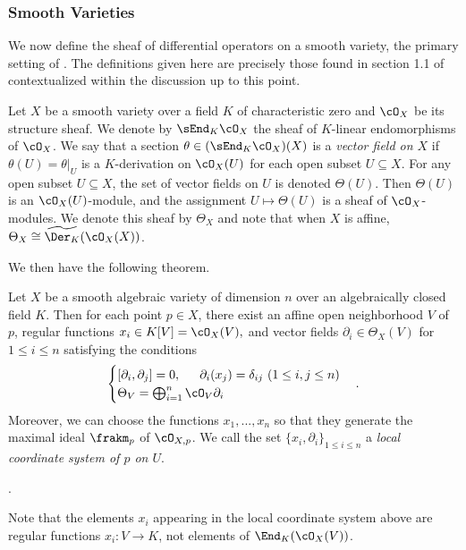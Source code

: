 \subsubsection{Smooth Varieties}
We now define the sheaf of differential operators on a smooth variety, the primary setting of \cite{d-mod_ps-rt}. The definitions given here are precisely those found in section 1.1 of \cite{d-mod_ps-rt} contextualized within the discussion up to this point.

\begin{defn}\label{defn:diff-ops-on-variety}
	Let $X$ be a smooth variety over a field $K$ of characteristic zero and $\cO_X$ be its structure sheaf. We denote by $\sEnd_K\cO_X$ the sheaf of $K$-linear endomorphisms of $\cO_X$. We say that a section $\theta \in (\sEnd_K\cO_X)(X)$ is a \emph{vector field on $X$} if $\theta(U) = \theta|_U$ is a $K$-derivation on $\cO_X(U)$ for each open subset $U \subseteq X$. For any open subset $U \subseteq X$, the set of vector fields on $U$ is denoted $\Theta(U)$. Then $\Theta(U)$ is an $\cO_X(U)$-module, and the assignment $U\mapsto \Theta(U)$ is a sheaf of $\cO_X$-modules. We denote this sheaf by $\Theta_X$ and note that when $X$ is affine, $\Theta_X \cong \widetilde{\Der_K}(\cO_X(X))$.
\end{defn}
We then have the following theorem.
\begin{thm}\label{thm:sheaf-of-vector-fields}
	Let $X$ be a smooth algebraic variety of dimension $n$ over an algebraically closed field $K$. Then for each point $p \in X$, there exist an affine open neighborhood $V$ of $p$, regular functions $x_i \in K[V] = \cO_X(V),$ and vector fields $\partial_i \in \Theta_X(V)$ for $1\leq i\leq n$ satisfying the conditions
	\begin{align*}
		\begin{cases}
		    [\partial_i,\partial_j] = 0, \hspace{1.5em} \partial_i(x_j) = \delta_{ij} ~ (1\leq i, j\leq n) \\
			\Theta_V = \bigoplus_{i=1}^n \cO_V \partial_i
		\end{cases}.
	\end{align*}
	Moreover, we can choose the functions $x_1,...,x_n$ so that they generate the maximal ideal $\frakm_p$ of $\cO_{X,p}$. We call the set $\{x_i,\partial_i\}_{1\leq i\leq n}$ a \emph{local coordinate system of $p$ on $U$}.
\end{thm}
\begin{prf}
	{\cite[Theorem A.5.1]{d-mod_ps-rt}}.
\end{prf}
Note that the elements $x_i$ appearing in the local coordinate system above are regular functions $x_i:V \to K$, not elements of $\End_K(\cO_X(V))$.

